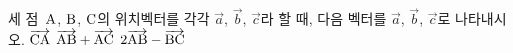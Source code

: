 세 점~$\mathrm{A}$, $\mathrm{B}$, $\mathrm{C}$의 위치벡터를 각각 $\vec{a}$, $\vec{b}$, $\vec{c}$라 할 때, 다음 벡터를 $\vec{a}$, $\vec{b}$, $\vec{c}$로 나타내시오.
 $\overrightarrow{\mathrm{CA}}$
 $\overrightarrow{\mathrm{AB}}+\overrightarrow{\mathrm{AC}}$
 $2\overrightarrow{\mathrm{AB}}-\overrightarrow{\mathrm{BC}}$
